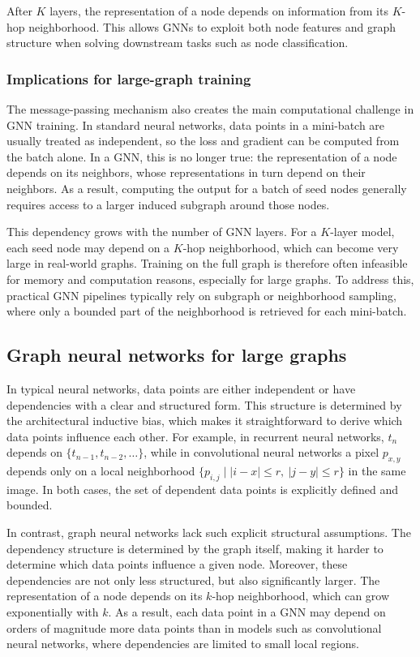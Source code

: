 \documentclass[PhD]{uclathes}
\begin{document}
After $K$ layers, the representation of a node depends on information from its
$K$-hop neighborhood. This allows GNNs to exploit both node features and graph
structure when solving downstream tasks such as node classification.

\subsubsection{Implications for large-graph training}
The message-passing mechanism also creates the main computational challenge in
GNN training. In standard neural networks, data points in a mini-batch are
usually treated as independent, so the loss and gradient can be computed from
the batch alone. In a GNN, this is no longer true: the representation of a node
depends on its neighbors, whose representations in turn depend on their
neighbors. As a result, computing the output for a batch of seed nodes
generally requires access to a larger induced subgraph around those nodes.

This dependency grows with the number of GNN layers. For a $K$-layer model,
each seed node may depend on a $K$-hop neighborhood, which can become very
large in real-world graphs. Training on the full graph is therefore often
infeasible for memory and computation reasons, especially for large graphs. To
address this, practical GNN pipelines typically rely on subgraph or
neighborhood sampling, where only a bounded part of the neighborhood is
retrieved for each mini-batch.

\subsection{Graph neural networks for large graphs}
In typical neural networks, data points are either independent or have
dependencies with a clear and structured form. This structure is determined by
the architectural inductive bias, which makes it straightforward to derive
which data points influence each other. For example, in recurrent neural
networks, $t_n$ depends on $\{t_{n-1}, t_{n-2}, \dots\}$, while in
convolutional neural networks a pixel $p_{x,y}$ depends only on a local
neighborhood $\{p_{i,j} \mid |i-x| \le r,\ |j-y| \le r\}$ in the same image.
In both cases, the set of dependent data points is explicitly defined and
bounded.

In contrast, graph neural networks lack such explicit structural assumptions.
The dependency structure is determined by the graph itself, making it harder to
determine which data points influence a given node. Moreover, these
dependencies are not only less structured, but also significantly larger. The
representation of a node depends on its $k$-hop neighborhood, which can grow
exponentially with $k$. As a result, each data point in a GNN may depend on
orders of magnitude more data points than in models such as convolutional
neural networks, where dependencies are limited to small local regions.
\end{document}
